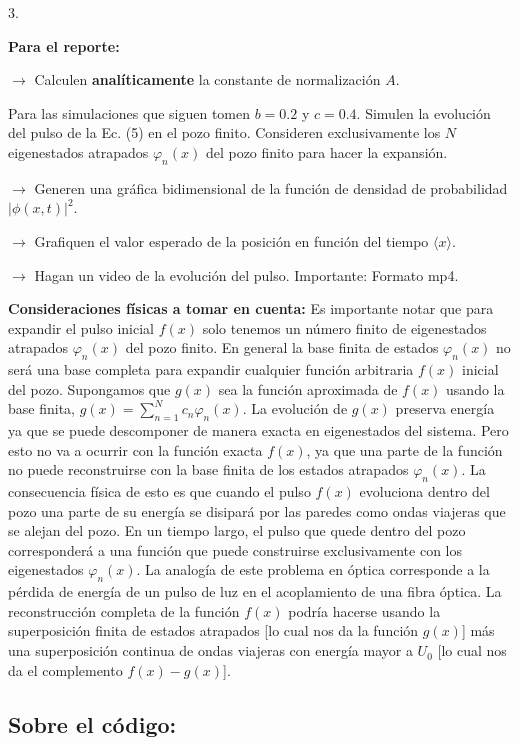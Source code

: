 \begin{pregunta}{3.}
\begin{enumerate}
\textbf{Para el reporte:}
 
$\rightarrow$ Calculen \textbf{analíticamente} la constante de normalización $A$.
 
Para las simulaciones que siguen tomen $b = 0.2$ y $c = 0.4$. Simulen la evolución del pulso de la Ec. (5) en el pozo finito. Consideren exclusivamente los $N$ eigenestados atrapados $\varphi_n(x)$ del pozo finito para hacer la expansión.
 
$\rightarrow$ Generen una gráfica bidimensional de la función de densidad de probabilidad $|\phi(x,t)|^2$.
 
$\rightarrow$ Grafiquen el valor esperado de la posición en función del tiempo $\langle x \rangle$.
 
$\rightarrow$ Hagan un video de la evolución del pulso. Importante: Formato mp4.
 
\textbf{Consideraciones físicas a tomar en cuenta:} Es importante notar que para expandir el pulso inicial $f(x)$ solo tenemos un número finito de eigenestados atrapados $\varphi_n(x)$ del pozo finito. En general la base finita de estados $\varphi_n(x)$ no será una base completa para expandir cualquier función arbitraria $f(x)$ inicial del pozo. Supongamos que $g(x)$ sea la función aproximada de $f(x)$ usando la base finita, $g(x) = \sum_{n=1}^{N} c_n \varphi_n(x)$. La evolución de $g(x)$ preserva energía ya que se puede descomponer de manera exacta en eigenestados del sistema. Pero esto no va a ocurrir con la función exacta $f(x)$, ya que una parte de la función no puede reconstruirse con la base finita de los estados atrapados $\varphi_n(x)$. La consecuencia física de esto es que cuando el pulso $f(x)$ evoluciona dentro del pozo una parte de su energía se disipará por las paredes como ondas viajeras que se alejan del pozo. En un tiempo largo, el pulso que quede dentro del pozo corresponderá a una función que puede construirse exclusivamente con los eigenestados $\varphi_n(x)$. La analogía de este problema en óptica corresponde a la pérdida de energía de un pulso de luz en el acoplamiento de una fibra óptica. La reconstrucción completa de la función $f(x)$ podría hacerse usando la superposición finita de estados atrapados [lo cual nos da la función $g(x)$] más una superposición continua de ondas viajeras con energía mayor a $U_0$ [lo cual nos da el complemento $f(x) - g(x)$].
\end{enumerate}
\end{pregunta}
\subsection*{Sobre el código:}

